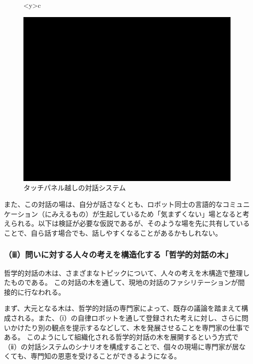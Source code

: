 \documentclass[b5j,twoside,twocolumn]{utarticle}
\begin{document}
\begin{figure}[h]
\centering
\begin{tabular}<y>{c}
\centering
\begin{minipage}[c]{0.65\hsize}
\centering
\includegraphics[scale=0.55]{system2}
\caption{タッチパネル越しの対話システム}
\end{minipage}
\end{tabular}
\end{figure}

また、この対話の場は、自分が話さなくとも、ロボット同士の言語的なコミュニケーション（にみえるもの）が生起しているため「気まずくない」場となると考えられる。以下は検証が必要な仮説であるが、そのような場を先に共有していることで、自ら話す場合でも、話しやすくなることがあるかもしれない。

\subsubsection*{（ⅲ）問いに対する人々の考えを構造化する「哲学的対話の木」}
哲学的対話の木は、さまざまなトピックについて、人々の考えを木構造で整理したものである。
この対話の木を通して、現地の対話のファシリテーションが間接的に行なわれる。

まず、大元となる木は、哲学的対話の専門家によって、既存の議論を踏まえて構成される。また、（ⅰ）の自律ロボットを通して登録された考えに対し、さらに問いかけたり別の観点を提示するなどして、木を発展させることを専門家の仕事である。
このようにして組織化される哲学的対話の木を展開するという方式で（ⅱ）の対話システムのシナリオを構成することで、個々の現場に専門家が居なくても、専門知の恩恵を受けることができるようになる。
\end{document}
